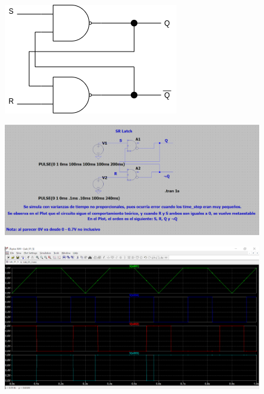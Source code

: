 \documentclass[11pt,a4paper]{article}
\begin{document}
\begin{enumerate}
\begin{itemize}
\begin{figure}[h!]
\centering
\includegraphics[scale=0.6]{8.png} 
\end{figure}
\pagebreak
\begin{figure}[h!]
\centering
\includegraphics[scale=0.2]{dia5.png} 
\end{figure}
\begin{figure}[h!]
\centering
\includegraphics[scale=0.2]{plot5.png} 
\end{figure}


\end{itemize}
\end{enumerate}
\end{document}
